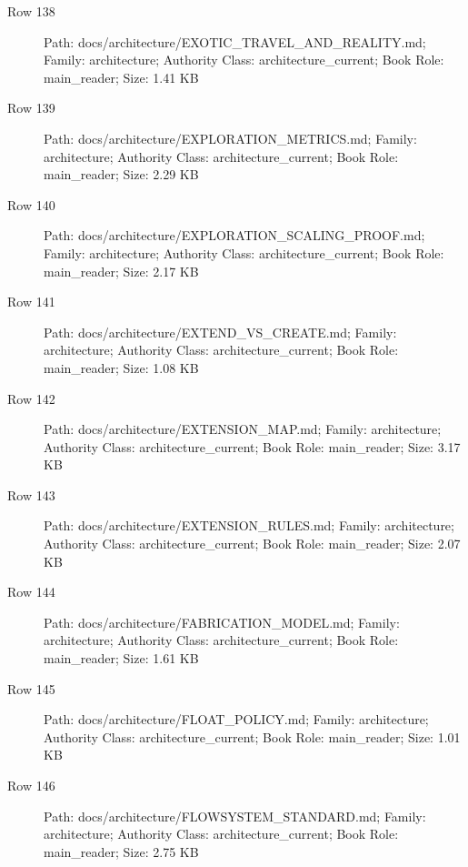 \documentclass[9pt,a4paper]{book}
\begin{document}
\begin{description}
\item[Row 138] Path: docs/\allowbreak{}architecture/\allowbreak{}EXOTIC\_\allowbreak{}TRAVEL\_\allowbreak{}AND\_\allowbreak{}REALITY.\allowbreak{}md; Family: architecture; Authority Class: architecture\_\allowbreak{}current; Book Role: main\_\allowbreak{}reader; Size: 1.\allowbreak{}41 KB
\item[Row 139] Path: docs/\allowbreak{}architecture/\allowbreak{}EXPLORATION\_\allowbreak{}METRICS.\allowbreak{}md; Family: architecture; Authority Class: architecture\_\allowbreak{}current; Book Role: main\_\allowbreak{}reader; Size: 2.\allowbreak{}29 KB
\item[Row 140] Path: docs/\allowbreak{}architecture/\allowbreak{}EXPLORATION\_\allowbreak{}SCALING\_\allowbreak{}PROOF.\allowbreak{}md; Family: architecture; Authority Class: architecture\_\allowbreak{}current; Book Role: main\_\allowbreak{}reader; Size: 2.\allowbreak{}17 KB
\item[Row 141] Path: docs/\allowbreak{}architecture/\allowbreak{}EXTEND\_\allowbreak{}VS\_\allowbreak{}CREATE.\allowbreak{}md; Family: architecture; Authority Class: architecture\_\allowbreak{}current; Book Role: main\_\allowbreak{}reader; Size: 1.\allowbreak{}08 KB
\item[Row 142] Path: docs/\allowbreak{}architecture/\allowbreak{}EXTENSION\_\allowbreak{}MAP.\allowbreak{}md; Family: architecture; Authority Class: architecture\_\allowbreak{}current; Book Role: main\_\allowbreak{}reader; Size: 3.\allowbreak{}17 KB
\item[Row 143] Path: docs/\allowbreak{}architecture/\allowbreak{}EXTENSION\_\allowbreak{}RULES.\allowbreak{}md; Family: architecture; Authority Class: architecture\_\allowbreak{}current; Book Role: main\_\allowbreak{}reader; Size: 2.\allowbreak{}07 KB
\item[Row 144] Path: docs/\allowbreak{}architecture/\allowbreak{}FABRICATION\_\allowbreak{}MODEL.\allowbreak{}md; Family: architecture; Authority Class: architecture\_\allowbreak{}current; Book Role: main\_\allowbreak{}reader; Size: 1.\allowbreak{}61 KB
\item[Row 145] Path: docs/\allowbreak{}architecture/\allowbreak{}FLOAT\_\allowbreak{}POLICY.\allowbreak{}md; Family: architecture; Authority Class: architecture\_\allowbreak{}current; Book Role: main\_\allowbreak{}reader; Size: 1.\allowbreak{}01 KB
\item[Row 146] Path: docs/\allowbreak{}architecture/\allowbreak{}FLOWSYSTEM\_\allowbreak{}STANDARD.\allowbreak{}md; Family: architecture; Authority Class: architecture\_\allowbreak{}current; Book Role: main\_\allowbreak{}reader; Size: 2.\allowbreak{}75 KB

\end{description}
\end{document}
